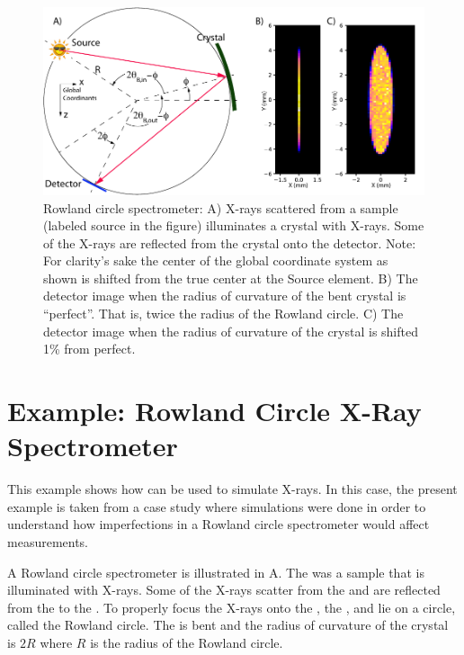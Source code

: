 \begin{figure}[tb]
  \centering
  \includegraphics[width=5in]{rowland-circle.pdf}
  \caption[Rowland circle spectrometer]
  {
Rowland circle spectrometer: A) X-rays scattered from a sample (labeled source in the figure)
illuminates a crystal with X-rays. Some of the X-rays are reflected from the crystal onto the
detector. Note: For clarity's sake the center of the global coordinate system as shown is shifted
from the true center at the Source element. B) The detector image when the radius of curvature of
the bent crystal is ``perfect''. That is, twice the radius of the Rowland circle. C) The detector
image when the radius of curvature of the crystal is shifted 1\% from perfect.
  }
  \label{f:rowland}
\end{figure}

\section{Example: Rowland Circle X-Ray Spectrometer}
\label{s:rowland}

This example shows how \bmad can be used to simulate X-rays. In this case, the present example is
taken from a case study where simulations were done in order to understand how imperfections in a Rowland
circle spectrometer would affect measurements.

A Rowland circle spectrometer is illustrated in A. The  was
a sample that is illuminated with X-rays. Some of the X-rays scatter from the  and are
reflected from the  to the . To properly focus the X-rays onto the
, the ,  and  lie on a circle, called the Rowland
circle. The  is bent and the radius of curvature of the crystal is
$2R$ where $R$ is the radius of the Rowland circle.

